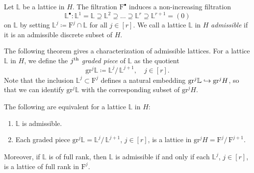 \documentclass[AHL,Unicode,longabstracts]{cedram}
\newcommand{\rquot}[2]{#1/\,#2}
\newcommand{\filter}{\mathrm{F}}
\renewcommand{\L}{\mathbb{L}}
\newcommand{\grm}[2]{\mathrm{gr}_{#1}^{#2}}
\newcommand{\longhookrightarrow}{\lhook\joinrel\longrightarrow}
\newcommand*{\hookto}{\mathchoice{\longhookrightarrow}{\hookrightarrow}{\hookrightarrow}{\hookrightarrow}}
\begin{document}
Let $\L$ be a lattice in $H$. The filtration $\filter^\bullet$ induces a non-increasing filtration
\[
\L^\bullet \colon \L^1=\L \supseteq \L^2 \supseteq \dots \supseteq \L^r \supseteq \L^{r+1} =(0)
\]
on $\L$ by setting $\L^j \coloneqq \filter^j\cap \L $ for all $j \in [r]$. We call a lattice $\L$ in $H$ \emph{admissible} if it is an admissible discrete subset of $H$.

The following theorem gives a characterization of admissible lattices. For a lattice $\L$ in $H$, we define the $j^{\rm th}$ \emph{graded piece} of $\L$ as the quotient
\[
\grm{}{j}\L\coloneqq \rquot{\L^j}{\L^{j+1}}, \quad j \in [r].
\]
Note that the inclusion $\L^j \subset \filter^j$ defines a natural embedding $\grm{}{j}\L \hookto \grm{}{j}H$, so that we can identify $\grm{}{j}\L$ with the corresponding subset of $\grm{}{j}H$.

\begin{theo} \label{thm:AdmissibleDiscreteLattices}
The following are equivalent for a lattice $\L$ in $H$:
\begin{enumerate}
\item\label{theo8.1.1} $\L$ is admissible.
\item\label{theo8.1.2} Each graded piece $\grm{}{j}\L = \rquot{\L^j}{\L^{j+1}}$, $j \in [r]$, is a lattice in $\grm{}{j}H = \rquot{\filter^j}{\filter^{j+1}}$.
\end{enumerate}
Moreover, if $\L$ is of full rank, then $\L$ is admissible if and only if each $\L^j$, $j \in [r]$, is a lattice of full rank in $\filter^j$.
\end{theo}
\end{document}
